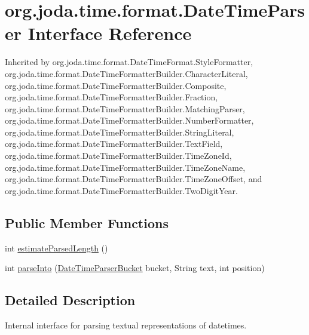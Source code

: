 \hypertarget{interfaceorg_1_1joda_1_1time_1_1format_1_1_date_time_parser}{\section{org.\-joda.\-time.\-format.\-Date\-Time\-Parser Interface Reference}
\label{interfaceorg_1_1joda_1_1time_1_1format_1_1_date_time_parser}
}


Inherited by org.\-joda.\-time.\-format.\-Date\-Time\-Format.\-Style\-Formatter, org.\-joda.\-time.\-format.\-Date\-Time\-Formatter\-Builder.\-Character\-Literal, org.\-joda.\-time.\-format.\-Date\-Time\-Formatter\-Builder.\-Composite, org.\-joda.\-time.\-format.\-Date\-Time\-Formatter\-Builder.\-Fraction, org.\-joda.\-time.\-format.\-Date\-Time\-Formatter\-Builder.\-Matching\-Parser, org.\-joda.\-time.\-format.\-Date\-Time\-Formatter\-Builder.\-Number\-Formatter, org.\-joda.\-time.\-format.\-Date\-Time\-Formatter\-Builder.\-String\-Literal, org.\-joda.\-time.\-format.\-Date\-Time\-Formatter\-Builder.\-Text\-Field, org.\-joda.\-time.\-format.\-Date\-Time\-Formatter\-Builder.\-Time\-Zone\-Id, org.\-joda.\-time.\-format.\-Date\-Time\-Formatter\-Builder.\-Time\-Zone\-Name, org.\-joda.\-time.\-format.\-Date\-Time\-Formatter\-Builder.\-Time\-Zone\-Offset, and org.\-joda.\-time.\-format.\-Date\-Time\-Formatter\-Builder.\-Two\-Digit\-Year.

\subsection*{Public Member Functions}
\begin{DoxyCompactItemize}
\item 
int \hyperlink{interfaceorg_1_1joda_1_1time_1_1format_1_1_date_time_parser_a656554b5063e79c32815b288ceff35d6}{estimate\-Parsed\-Length} ()
\item 
int \hyperlink{interfaceorg_1_1joda_1_1time_1_1format_1_1_date_time_parser_ae3e39838715ec80672964b26dd90d2eb}{parse\-Into} (\hyperlink{classorg_1_1joda_1_1time_1_1format_1_1_date_time_parser_bucket}{Date\-Time\-Parser\-Bucket} bucket, String text, int position)
\end{DoxyCompactItemize}


\subsection{Detailed Description}
Internal interface for parsing textual representations of datetimes. 

